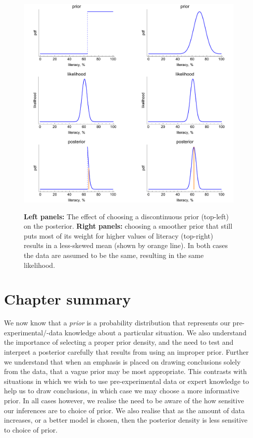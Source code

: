\documentclass[11pt,fullpage]{book}
\begin{document}
\begin{figure}
\centering
\scalebox{0.40} 
{\includegraphics{Prior_overZealous.pdf}}\caption{\textbf{Left panels:} The effect of choosing a discontinuous prior (top-left) on the posterior. \textbf{Right panels:} choosing a smoother prior that still puts most of its weight for higher values of literacy (top-right) results in a less-skewed mean (shown by orange line). In both cases the data are assumed to be the same, resulting in the same likelihood.}\label{fig:Prior_overZealous}
\end{figure}

\section{Chapter summary}
We now know that a \textit{prior} is a probability distribution that represents our pre-experimental/-data knowledge about a particular situation. We also understand the importance of selecting a proper prior density, and the need to test and interpret a posterior carefully that results from using an improper prior. Further we understand that when an emphasis is placed on drawing conclusions solely from the data, that a vague prior may be most appropriate. This contrasts with situations in which we wish to use pre-experimental data or expert knowledge to help us to draw conclusions, in which case we may choose a more informative prior. In all cases however, we realise the need to be aware of the how sensitive our inferences are to choice of prior. We also realise that as the amount of data increases, or a better model is chosen, then the posterior density is less sensitive to choice of prior.
\end{document}

